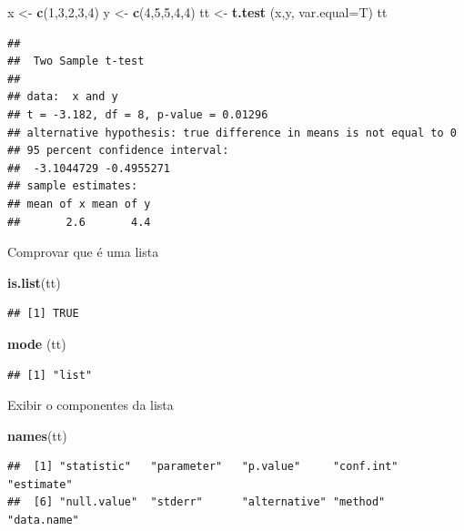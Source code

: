 \documentclass[
]{book}
\newenvironment{Shaded}{\begin{snugshade}}{\end{snugshade}}
\newcommand{\DataTypeTok}[1]{\textcolor[rgb]{0.13,0.29,0.53}{#1}}
\newcommand{\DecValTok}[1]{\textcolor[rgb]{0.00,0.00,0.81}{#1}}
\newcommand{\KeywordTok}[1]{\textcolor[rgb]{0.13,0.29,0.53}{\textbf{#1}}}
\newcommand{\NormalTok}[1]{#1}
\newcommand{\StringTok}[1]{\textcolor[rgb]{0.31,0.60,0.02}{#1}}
\begin{document}
\begin{Shaded}
\begin{Highlighting}[]
\NormalTok{x <-}\StringTok{ }\KeywordTok{c}\NormalTok{(}\DecValTok{1}\NormalTok{,}\DecValTok{3}\NormalTok{,}\DecValTok{2}\NormalTok{,}\DecValTok{3}\NormalTok{,}\DecValTok{4}\NormalTok{)}
\NormalTok{y <-}\StringTok{ }\KeywordTok{c}\NormalTok{(}\DecValTok{4}\NormalTok{,}\DecValTok{5}\NormalTok{,}\DecValTok{5}\NormalTok{,}\DecValTok{4}\NormalTok{,}\DecValTok{4}\NormalTok{)}
\NormalTok{tt <-}\StringTok{ }\KeywordTok{t.test}\NormalTok{ (x,y, }\DataTypeTok{var.equal=}\NormalTok{T)}
\NormalTok{tt}
\end{Highlighting}
\end{Shaded}

\begin{verbatim}
## 
##  Two Sample t-test
## 
## data:  x and y
## t = -3.182, df = 8, p-value = 0.01296
## alternative hypothesis: true difference in means is not equal to 0
## 95 percent confidence interval:
##  -3.1044729 -0.4955271
## sample estimates:
## mean of x mean of y 
##       2.6       4.4
\end{verbatim}

Comprovar que é uma lista

\begin{Shaded}
\begin{Highlighting}[]
\KeywordTok{is.list}\NormalTok{(tt)}
\end{Highlighting}
\end{Shaded}

\begin{verbatim}
## [1] TRUE
\end{verbatim}

\begin{Shaded}
\begin{Highlighting}[]
\KeywordTok{mode}\NormalTok{ (tt)}
\end{Highlighting}
\end{Shaded}

\begin{verbatim}
## [1] "list"
\end{verbatim}

Exibir o componentes da lista

\begin{Shaded}
\begin{Highlighting}[]
\KeywordTok{names}\NormalTok{(tt)}
\end{Highlighting}
\end{Shaded}

\begin{verbatim}
##  [1] "statistic"   "parameter"   "p.value"     "conf.int"    "estimate"   
##  [6] "null.value"  "stderr"      "alternative" "method"      "data.name"
\end{verbatim}
\end{document}
